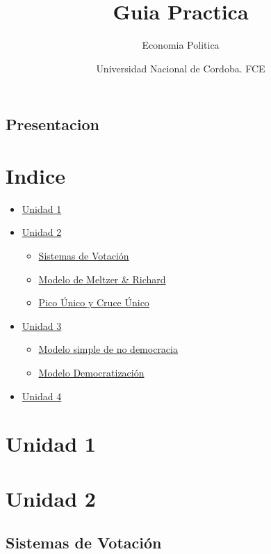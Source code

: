 \documentclass[
  letterpaper,
  DIV=11,
  numbers=noendperiod]{scrartcl}
\title{Guia Practica}
\subtitle{Economia Politica}
\author{Universidad Nacional de Cordoba. FCE}
\date{}
\providecommand{\tightlist}{%
  \setlength{\itemsep}{0pt}\setlength{\parskip}{0pt}}
\begin{document}
\maketitle


\newpage

\subsection{Presentacion}\label{presentacion}

\newpage

\section{Indice}\label{indice}

\begin{itemize}
\item
  \hyperref[1]{Unidad 1}
\item
  \hyperref[2]{Unidad 2}

  \begin{itemize}
  \tightlist
  \item
    \hyperref[2_1]{Sistemas de Votación}
  \item
    \hyperref[2_2]{Modelo de Meltzer \& Richard}
  \item
    \hyperref[2_3]{Pico Único y Cruce Único}
  \end{itemize}
\item
  \hyperref[3]{Unidad 3}

  \begin{itemize}
  \tightlist
  \item
    \hyperref[3_1]{Modelo simple de no democracia}
  \item
    \hyperref[3_2]{Modelo Democratización}
  \end{itemize}
\item
  \hyperref[4]{Unidad 4}
\end{itemize}

\newpage

\section{Unidad 1}\label{1}

\newpage

\section{Unidad 2}\label{2}

\subsection{Sistemas de Votación}\label{2_1}
\end{document}
